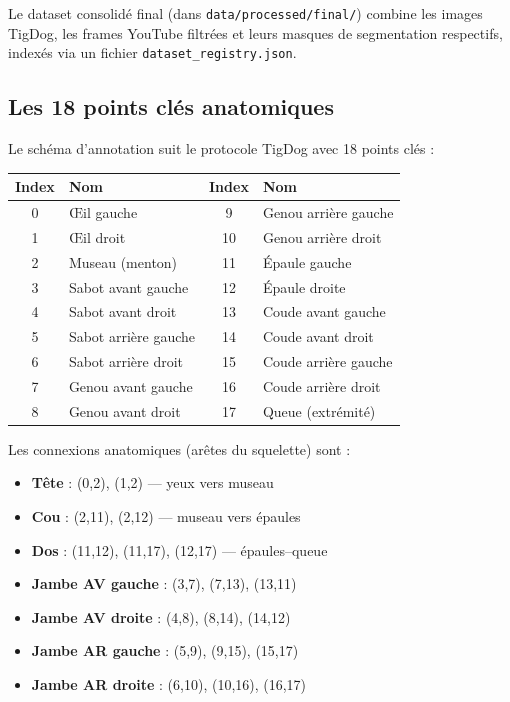 \documentclass[12pt,a4paper]{article}
\begin{document}
Le dataset consolidé final (dans \texttt{data/processed/final/}) combine les images
TigDog, les frames YouTube filtrées et leurs masques de segmentation respectifs,
indexés via un fichier \texttt{dataset\_registry.json}.

\subsection{Les 18 points clés anatomiques}

Le schéma d'annotation suit le protocole TigDog avec 18 points clés :

\begin{center}
\begin{tabular}{clcl}
\toprule
\textbf{Index} & \textbf{Nom} & \textbf{Index} & \textbf{Nom} \\
\midrule
0  & Œil gauche         & 9  & Genou arrière gauche \\
1  & Œil droit          & 10 & Genou arrière droit  \\
2  & Museau (menton)    & 11 & Épaule gauche        \\
3  & Sabot avant gauche & 12 & Épaule droite        \\
4  & Sabot avant droit  & 13 & Coude avant gauche   \\
5  & Sabot arrière gauche & 14 & Coude avant droit  \\
6  & Sabot arrière droit  & 15 & Coude arrière gauche \\
7  & Genou avant gauche   & 16 & Coude arrière droit  \\
8  & Genou avant droit    & 17 & Queue (extrémité)    \\
\bottomrule
\end{tabular}
\end{center}

Les connexions anatomiques (arêtes du squelette) sont :
\begin{itemize}
  \item \textbf{Tête} : (0,2), (1,2) --- yeux vers museau
  \item \textbf{Cou} : (2,11), (2,12) --- museau vers épaules
  \item \textbf{Dos} : (11,12), (11,17), (12,17) --- épaules--queue
  \item \textbf{Jambe AV gauche} : (3,7), (7,13), (13,11)
  \item \textbf{Jambe AV droite} : (4,8), (8,14), (14,12)
  \item \textbf{Jambe AR gauche} : (5,9), (9,15), (15,17)
  \item \textbf{Jambe AR droite} : (6,10), (10,16), (16,17)
\end{itemize}
\end{document}
